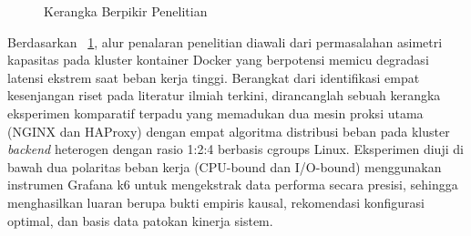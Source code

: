 \begin{figure}[H]
    \caption{Kerangka Berpikir Penelitian}
    \label{fig:kerangka_berpikir}
\end{figure}

Berdasarkan \figurename\ \ref{fig:kerangka_berpikir}, alur penalaran penelitian diawali dari permasalahan asimetri kapasitas pada kluster kontainer Docker yang berpotensi memicu degradasi latensi ekstrem saat beban kerja tinggi. Berangkat dari identifikasi empat kesenjangan riset pada literatur ilmiah terkini, dirancanglah sebuah kerangka eksperimen komparatif terpadu yang memadukan dua mesin proksi utama (NGINX dan HAProxy) dengan empat algoritma distribusi beban pada kluster \textit{backend} heterogen dengan rasio 1:2:4 berbasis cgroups Linux. Eksperimen diuji di bawah dua polaritas beban kerja (CPU-bound dan I/O-bound) menggunakan instrumen Grafana k6 untuk mengekstrak data performa secara presisi, sehingga menghasilkan luaran berupa bukti empiris kausal, rekomendasi konfigurasi optimal, dan basis data patokan kinerja sistem.
